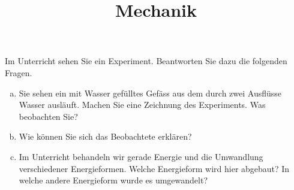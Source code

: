 \documentclass[paper=landscape]{scrartcl}
\title{Mechanik}
\date{}
\begin{document}
\maketitle



\newpage

%

%
\newpage

\newpage

%
%


%















\begin{aufgabe}
    Im Unterricht sehen Sie ein Experiment.
    Beantworten Sie dazu die folgenden Fragen.
\begin{enumerate} [a)]
    \item Sie sehen ein mit Wasser gefülltes Gefäss aus dem durch zwei Ausflüsse Wasser ausläuft.
    Machen Sie eine Zeichnung des Experiments. Was beobachten Sie?
\item Wie können Sie sich das Beobachtete erklären?
\item Im Unterricht behandeln wir gerade Energie und die Umwandlung verschiedener Energieformen.
    Welche Energieform wird hier abgebaut? In welche andere Energieform wurde es umgewandelt?
\end{enumerate}
\end{aufgabe}





\newpage
{}
\end{document}

